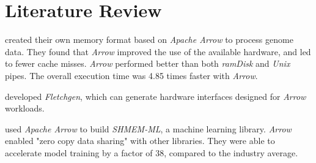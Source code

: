 \chapter{Literature Review}
\label{chapter:Literature}


\textcite{Ahmad2020}
created their own memory format based on \emph{Apache Arrow} to process genome data.
They found that \emph{Arrow} improved the use of the available hardware, and led to fewer cache misses.
\emph{Arrow} performed better than both \emph{ramDisk} and \emph{Unix} pipes.
The overall execution time was 4.85 times faster with \emph{Arrow}.


\textcite{Peltenburg2021}
developed \emph{Fletchgen}, which can generate hardware interfaces designed for \emph{Arrow} workloads.



\textcite{Grossman2022}
used \emph{Apache Arrow} to build \emph{SHMEM-ML}, a machine learning library.
\emph{Arrow} enabled "zero copy data sharing" with other libraries.
They were able to accelerate model training by a factor of 38, compared to the industry average.




